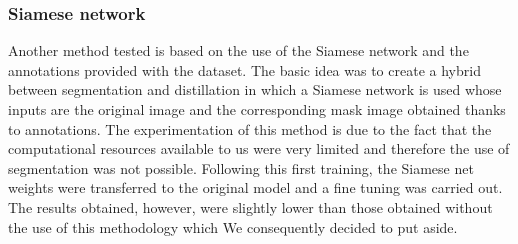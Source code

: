 \documentclass[journal, a4paper]{IEEEtran}
\begin{document}
\subsubsection{Siamese network}
Another method tested is based on the use of the Siamese network and the annotations provided with the dataset. The basic idea was to create a hybrid between segmentation and distillation in which a Siamese network is used whose inputs are the original image and the corresponding mask image obtained thanks to annotations. The experimentation of this method is due to the fact that the computational resources available to us were very limited and therefore the use of segmentation was not possible. Following this first training, the Siamese net weights were transferred to the original model and a fine tuning was carried out. The results obtained, however, were slightly lower than those obtained without the use of this methodology which We consequently decided to put aside.
\end{document}

